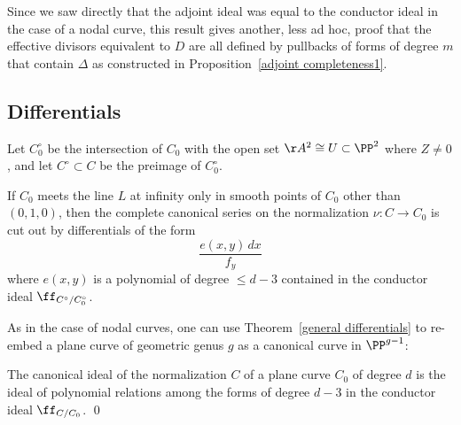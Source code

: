 Since we saw directly that the adjoint ideal was equal to the conductor
ideal in the case of
a nodal curve, this result gives another, less ad hoc, proof that the
effective divisors equivalent to $D$
are all defined by
pullbacks of forms of degree $m$ that contain $\Delta$
as constructed in Proposition~\ref{adjoint completeness1}.

\subsection*{Differentials}

Let $C^\circ_0$ be the intersection of $C_0$ with the open set
$\AA^{2}\cong U\subset \PP^{2}$ where $Z \neq 0$,
and let $C^\circ \subset C$ be the preimage of $C^\circ_0$.

\begin{theorem}\label{general differentials}
If $C_{0}$ meets the line $L$ at infinity only in smooth points of
$C_{0}$ other than $(0,1,0)$, then the complete canonical series on the
normalization $\nu: C \to C_{0}$ is cut out by differentials of the form
$$
 \frac{e(x,y)\,dx}{f_{y}}
$$
where $e(x,y)$ is a polynomial of degree $\leq d-3$ contained in the
conductor ideal $\ff_{C^{\circ}/C_{0}^{\circ}}$.
\unif
\end{theorem}

As in the case of nodal curves, one can use
Theorem~\ref{general differentials} to re-embed a plane curve of
geometric genus $g$ as a canonical curve in $\PP^{g-1}$:

\begin{corollary}
 The canonical ideal of the normalization $C$ of a plane curve $C_{0}$
%
%
%
 of degree $d$
 is the ideal of polynomial relations
 among the forms of degree $d-3$ in the 
conductor ideal
 $\ff_{C/C_{0}}$. \qed
\end{corollary}

